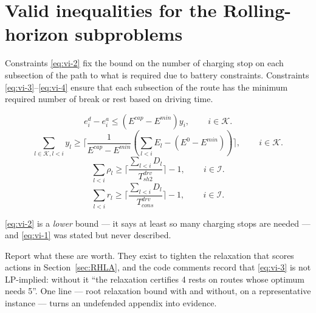 \section{Valid inequalities for the Rolling-horizon subproblems} \label{sec:valid_inequ}

Constraints \eqref{eq:vi-2} fix the  bound on the number of charging stop on each subsection of the path to what is required due to battery constraints. Constraints \eqref{eq:vi-3}--\eqref{eq:vi-4} ensure that each subsection of the route has the minimum required number of break or rest based on driving time. 

\begin{equation}
    e^d_i-e^a_i \leq (E^{cap}-E^{min})y_i,
    \qquad \, i \in \mathcal{K}.
    \label{eq:vi-1}
\end{equation}
\begin{equation}
    \sum_{l \in \mathcal K, l<i} y_l \geq \lceil \frac{1}{E^{cap}-E^{min}}(\sum_{l < i} E_l - (E^{0}-E^{min})) \rceil,
    \qquad \, i \in \mathcal{K}.
    \label{eq:vi-2}
\end{equation}
\begin{equation}
    \sum_{l<i} \rho_l \geq \lceil \frac{\sum_{l<i} D_l}{T^{drv}_{sh2}} \rceil-1,
    \qquad \, i \in \mathcal{I}.
    \label{eq:vi-3}
\end{equation}
\begin{equation}
    \sum_{l<i} r_l \geq \lceil \frac{\sum_{l<i} D_l}{T^{drv}_{cons}} \rceil -1,
    \qquad \, i \in \mathcal{I}.
    \label{eq:vi-4}
\end{equation}

\begin{afix}
\eqref{eq:vi-2} is a \emph{lower} bound --- it says at least so many charging
stops are needed --- and \eqref{eq:vi-1} was stated but never described.
\end{afix}

\begin{atodo}
Report what these are worth. They exist to tighten the relaxation that scores
actions in Section~\ref{sec:RHLA}, and the code comments record that
\eqref{eq:vi-3} is not LP-implied: without it ``the relaxation certifies 4 rests
on routes whose optimum needs 5''. One line --- root relaxation bound with and
without, on a representative instance --- turns an undefended appendix into
evidence.
\end{atodo}



